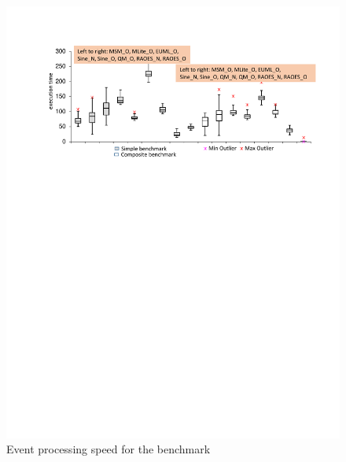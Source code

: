 \begin{figure}
	\centering
	\includegraphics[clip, trim=2.8cm 18.0cm 1.7cm 2.5cm, width=\columnwidth]{experiments/box-plot-mine.pdf}
	\caption{Event processing speed for the benchmark} 
	\label{fig:boxplot}
\end{figure}


